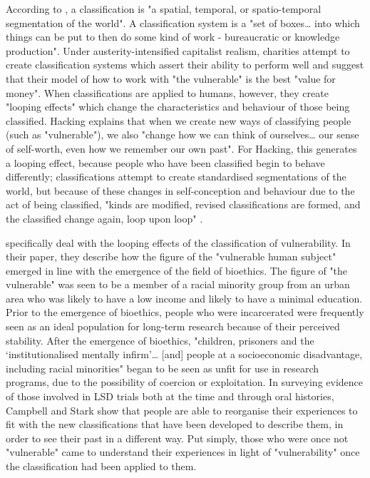 According to \citet[p. 110]{bowker_sorting_1999}, a classification is "a spatial, temporal, or spatio-temporal segmentation of the world". A classification system is a "set of boxes\ldots{} into which things can be put to then do some kind of work - bureaucratic or knowledge production". Under austerity-intensified capitalist realism, charities attempt to create classification systems which assert their ability to perform well and suggest that their model of how to work with "the vulnerable" is the best "value for money". When  classifications are applied to humans, however, they create "looping effects" \citep{hacking_looping_1996} which change the characteristics and behaviour of those being classified. Hacking  explains that when we create new ways of classifying people (such as "vulnerable"), we also "change how we can think of ourselves\ldots{} our sense of self-worth, even how we remember our own past". For Hacking, this generates a looping effect, because people who have been classified begin to behave differently; classifications attempt to create standardised segmentations of the world, but because of these changes in self-conception and behaviour due to the act of being classified, "kinds are modified, revised classifications are formed, and the classified change again, loop upon loop" \citep[p. 370]{hacking_looping_1996}.

\citet{campbell_making_2015} specifically deal with the looping effects of the classification of vulnerability. In their paper, they describe how the figure of the "vulnerable human subject" emerged in line with the
emergence of the field of bioethics. The figure of "the vulnerable" was seen to be a member of a racial minority group from an urban area who was likely to have a low income and likely to have a minimal education. Prior to the emergence of bioethics, people who were incarcerated were frequently seen as an ideal population for long-term research because of their perceived stability. After the emergence of bioethics, "children, prisoners and the `institutionalised mentally infirm'\ldots{} [and] people at a socioeconomic disadvantage, including racial minorities" \citep[p. 16]{campbell_making_2015} began to be seen as unfit for use in research programs, due to the possibility of coercion or exploitation. In surveying evidence of those involved in LSD trials both at the time and through oral histories, Campbell and Stark show that people are able to reorganise their experiences to fit with the new classifications that have been developed to describe them, in order to see their past in a different way. Put simply, those who were once not "vulnerable" came to understand their experiences in light of "vulnerability" once the classification had been applied to them.

